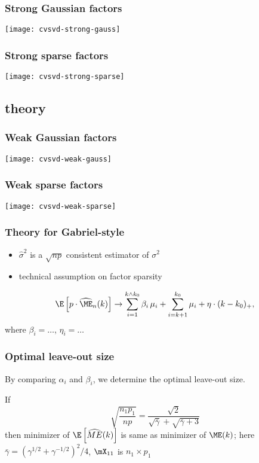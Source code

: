 \documentclass[14pt]{beamer}
\begin{document}
\begin{frame}
  \frametitle{Strong Gaussian factors}
  \begin{center}
  \texttt{[image: cvsvd-strong-gauss]}
  \end{center}
\end{frame}

\begin{frame}
  \frametitle{Strong sparse factors}
  \begin{center}
  \texttt{[image: cvsvd-strong-sparse]}
  \end{center}
\end{frame}
\subsection{theory}

\begin{frame}
  \frametitle{Weak Gaussian factors}
  \begin{center}
  \texttt{[image: cvsvd-weak-gauss]}
  \end{center}
\end{frame}


\begin{frame}
  \frametitle{Weak sparse factors}
  \begin{center}
  \texttt{[image: cvsvd-weak-sparse]}
  \end{center}
\end{frame}

\begin{frame}
  \frametitle{Theory for Gabriel-style}
  \begin{itemize}
  \item $\hat \sigma^2$ is a $\sqrt{np}$ consistent estimator of $\sigma^2$
  \item technical assumption on factor sparsity
  \end{itemize}
  \begin{theorem}
  \[
\E \left[ p \cdot \widehat{\ME}_n(k) \right]
			\to
				\sum_{i=1}^{k \wedge k_0}
					\beta_i \, \mu_i
				+
				\sum_{i=k+1}^{k_0}
					\mu_i
				+
				\eta
				\cdot
				(k - k_0)_+,
  \]
  where $\beta_i = \ldots$, $\eta_i = \ldots$
  \end{theorem}
\end{frame}

\begin{frame}
  \frametitle{Optimal leave-out size}
  By comparing $\alpha_i$ and $\beta_i$, we determine the optimal leave-out size.
  \begin{theorem}
    If
    \[
       \sqrt{\frac{n_1 p_1}{n p}}
       =
       \frac{\sqrt{2}}{\sqrt{\bar \gamma} + \sqrt{\bar \gamma + 3}}
    \]
    then minimizer of $\E\left[\widehat{ME}(k)\right]$ is same as minimizer of $\ME(k)$;
    here
    \(
      \bar \gamma = (\gamma^{1/2} + \gamma^{-1/2})^2/4
    \),
    $\mX_{11}$ is $n_1 \times p_1$
  \end{theorem}
\end{frame}
\end{document}
